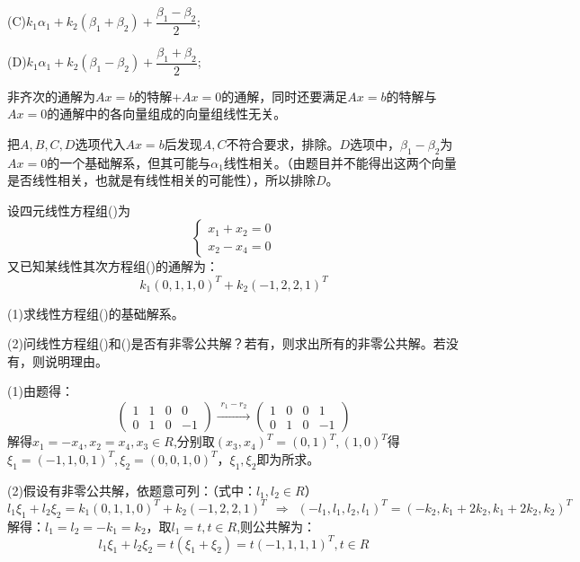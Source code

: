 \documentclass[a4paper]{report}
\begin{document}
(C)$k_1\alpha_1+k_2(\beta_1+\beta_2)+\dfrac{\beta_1-\beta_2}{2}$;

(D)$k_1\alpha_1+k_2(\beta_1-\beta_2)+\dfrac{\beta_1+\beta_2}{2}$;

\begin{jie}
非齐次的通解为$Ax=b$的特解+$Ax=0$的通解，同时还要满足$Ax=b$的特解与$Ax=0$的通解中的各向量组成的向量组线性无关。

把$A,B,C,D$选项代入$Ax=b$后发现$A,C$不符合要求，排除。$D$选项中，$\beta_1-\beta_2$为$Ax=0$的一个基础解系，但其可能与$\alpha_1$线性相关。（由题目并不能得出这两个向量是否线性相关，也就是有线性相关的可能性），所以排除$D$。
\end{jie}

%
%

\EX 设四元线性方程组(\uppercase\expandafter{})为
\begin{equation*}
\begin{cases}
x_1+x_2=0\\
x_2-x_4=0
\end{cases}
\end{equation*}
又已知某线性其次方程组(\uppercase\expandafter{})的通解为：
\begin{equation*}
k_1(0,1,1,0)^T + k_2(-1,2,2,1)^T
\end{equation*}

(1)求线性方程组(\uppercase\expandafter{})的基础解系。

(2)问线性方程组(\uppercase\expandafter{})和(\uppercase\expandafter{})是否有非零公共解？若有，则求出所有的非零公共解。若没有，则说明理由。

\begin{jie}
(1)由题得：
\begin{equation*}
\begin{pmatrix}
1&1&0&0\\
0&1&0&-1
\end{pmatrix}
\xrightarrow{\substack{r_1-r_2}}
{
\begin{pmatrix}
1&0&0&1\\
0&1&0&-1
\end{pmatrix}
}
\end{equation*}
解得$x_1=-x_4,x_2=x_4,x_3\in R$,分别取$(x_3,x_4)^T=(0,1)^T,(1,0)^T$得$\xi_1=(-1,1,0,1)^T,\xi_2=(0,0,1,0)^T$，$\xi_1,\xi_2$即为所求。

(2)假设有非零公共解，依题意可列：（式中：$l_1,l_2\in R$）
\begin{equation*}
l_1\xi_1+l_2\xi_2=k_1(0,1,1,0)^T + k_2(-1,2,2,1)^T~~\Rightarrow~~(-l_1,l_1,l_2,l_1)^T=(-k_2,k_1+2k_2,k_1+2k_2,k_2)^T
\end{equation*}
解得：$l_1=l_2=-k_1=k_2$，取$l_1=t,t\in R$,则公共解为：
\begin{equation*}
l_1\xi_1+l_2\xi_2=t(\xi_1+\xi_2)=t(-1,1,1,1)^T,t\in R
\end{equation*}
\end{jie}
\end{document}

